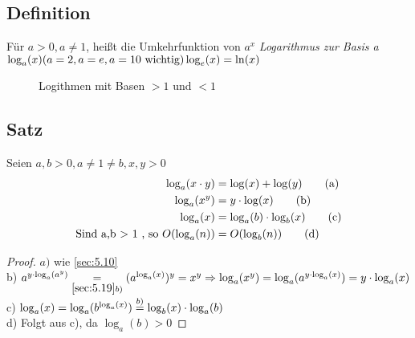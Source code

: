 \subsection{Definition}
Für $a > 0, a \neq 1$, hei\ss t die Umkehrfunktion von $a^x$ \emph{Logarithmus zur Basis a} \\
$\log_a (x) \hfill (a =2,a=e,a=10 \text{ wichtig})\\
\log_e (x) = \ln (x)\\
$
\begin{figure}[h!]
\centering
{}
\caption{Logithmen mit Basen $>1$ und $<1$}
\end{figure}
\subsection[Satz]{Satz}
Seien $a,b > 0 , a \neq 1 \neq b , x , y > 0$
\begin{align}
\log_a(x\cdot y) &= \log(x) + \log(y) \tag{a}\\
\log_a(x^y) &= y \cdot \log(x) \tag{b}\\
\log_a(x) &= \log_a(b) \cdot \log_b(x) \tag{c}\\
\text{Sind a,b > 1 , so } O(\log_a(n)) &= O(\log_b(n)) \tag{d}
\end{align}
\begin{proof}
$a)$ wie \ref{sec:5.10}\\
b) $a^{y \cdot \log_a(a^y)} \underset{\ref{sec:5.19}b)}{=}(a^{\log_a(x)})^{y} = x^y\\
\Rightarrow \log_a(x^y) = \log_a(a^{y \cdot \log_a(x)}) = y \cdot \log_a(x)$\\
c) $\log_a(x) = \log_a(b^{\log_a(x)}) \overset{b)}{=} \log_b(x) \cdot \log_a(b)$\\
d) Folgt aus c), da $\log_a(b) > 0$
\end{proof}
